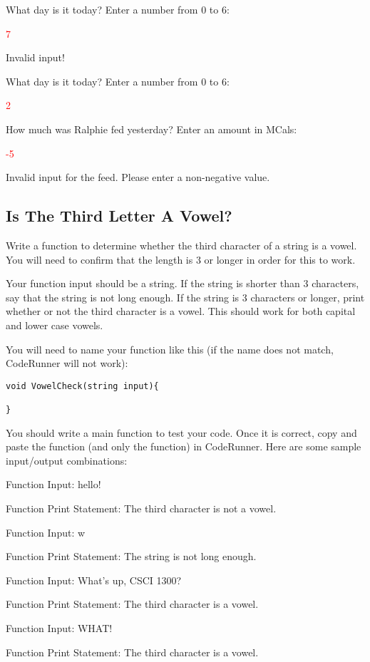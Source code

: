 \begin{sample}
What day is it today? Enter a number from 0 to 6:

 \textcolor{red}{7}
 
Invalid input!

\end{sample}
\begin{sample}
What day is it today? Enter a number from 0 to 6:

 \textcolor{red}{2}
 
How much was Ralphie fed yesterday? Enter an amount in MCals:

 \textcolor{red}{-5}
 
Invalid input for the feed. Please enter a non-negative value.

\end{sample}

\subsection{Is The Third Letter A Vowel?}
Write a function to determine whether the third character of a string is a vowel. You will need to confirm that the length is 3 or longer in order for this to work.

Your function input should be a string. If the string is shorter than 3 characters, say that the string is not long enough. If the string is 3 characters or longer, print whether or not the third character is a vowel. This should work for both capital and lower case vowels.

You will need to name your function like this (if the name does not match, CodeRunner will not work):

\begin{verbatim}
void VowelCheck(string input){

}
\end{verbatim}

You should write a main function to test your code. Once it is correct, copy and paste the function (and only the function) in CodeRunner. Here are some sample input/output combinations:

\begin{sample}
    Function Input: hello!
    
    Function Print Statement: The third character is not a vowel.
\end{sample}

\begin{sample}
    Function Input: w
    
    Function Print Statement: The string is not long enough.
\end{sample}

\begin{sample}
    Function Input: What's up, CSCI 1300?

    Function Print Statement: The third character is a vowel.
\end{sample}

\begin{sample}
    Function Input: WHAT!

    Function Print Statement: The third character is a vowel.
\end{sample}
